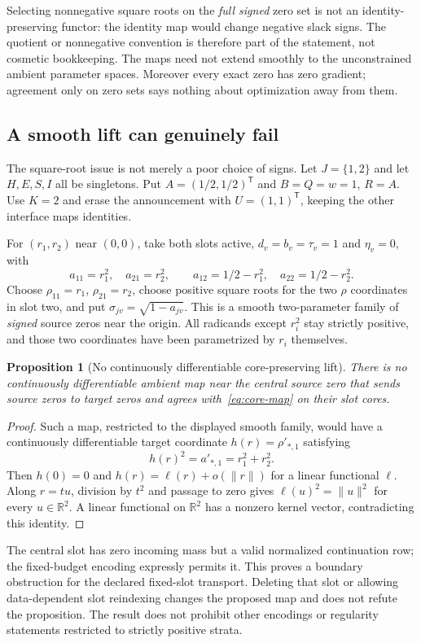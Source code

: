 \documentclass[11pt]{article}
\newcommand{\R}{\mathbb R}
\newtheorem{proposition}[theorem]{Proposition}
\theoremstyle{remark}
\begin{document}
Selecting nonnegative square roots on the \emph{full signed} zero set is not an identity-preserving functor: the identity map would change negative slack signs. The quotient or nonnegative convention is therefore part of the statement, not cosmetic bookkeeping. The maps need not extend smoothly to the unconstrained ambient parameter spaces. Moreover every exact zero has zero gradient; agreement only on zero sets says nothing about optimization away from them.

\subsection{A smooth lift can genuinely fail}\label{sec:no-c1}
The square-root issue is not merely a poor choice of signs. Let $J=\{1,2\}$ and let $H,E,S,I$ all be singletons. Put $A=(1/2,1/2)^{\mathsf T}$ and $B=Q=w=1$, $R=A$. Use $K=2$ and erase the announcement with $U=(1,1)^{\mathsf T}$, keeping the other interface maps identities.

For $(r_1,r_2)$ near $(0,0)$, take both slots active, $d_v=b_v=\tau_v=1$ and $\eta_v=0$, with
\[
 a_{11}=r_1^2,\quad a_{21}=r_2^2,\qquad
 a_{12}=1/2-r_1^2,\quad a_{22}=1/2-r_2^2.
\]
Choose $\rho_{11}=r_1$, $\rho_{21}=r_2$, choose positive square roots for the two $\rho$ coordinates in slot two, and put $\sigma_{jv}=\sqrt{1-a_{jv}}$. This is a smooth two-parameter family of \emph{signed} source zeros near the origin. All radicands except $r_i^2$ stay strictly positive, and those two coordinates have been parametrized by $r_i$ themselves.

\begin{proposition}[No continuously differentiable core-preserving lift]\label{prop:no-c1}
There is no continuously differentiable ambient map near the central source zero that sends source zeros to target zeros and agrees with~\eqref{eq:core-map} on their slot cores.
\end{proposition}
\begin{proof}
Such a map, restricted to the displayed smooth family, would have a continuously differentiable target coordinate $h(r)=\rho'_{*,1}$ satisfying
\[
 h(r)^2=a'_{*,1}=r_1^2+r_2^2.
\]
Then $h(0)=0$ and $h(r)=\ell(r)+o(\|r\|)$ for a linear functional $\ell$. Along $r=tu$, division by $t^2$ and passage to zero gives $\ell(u)^2=\|u\|^2$ for every $u\in\R^2$. A linear functional on $\R^2$ has a nonzero kernel vector, contradicting this identity.
\end{proof}

The central slot has zero incoming mass but a valid normalized continuation row; the fixed-budget encoding expressly permits it. This proves a boundary obstruction for the declared fixed-slot transport. Deleting that slot or allowing data-dependent slot reindexing changes the proposed map and does not refute the proposition. The result does not prohibit other encodings or regularity statements restricted to strictly positive strata.
\end{document}
